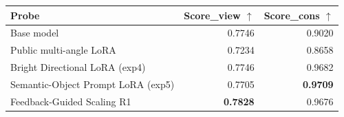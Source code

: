 \begin{tabular}{lrr}
\toprule
Probe & Score\_view $\uparrow$ & Score\_cons $\uparrow$ \\
\midrule
Base model & 0.7746 & 0.9020 \\
Public multi-angle LoRA & 0.7234 & 0.8658 \\
Bright Directional LoRA (exp4) & 0.7746 & 0.9682 \\
Semantic-Object Prompt LoRA (exp5) & 0.7705 & \textbf{0.9709} \\
Feedback-Guided Scaling R1 & \textbf{0.7828} & 0.9676 \\
\bottomrule
\end{tabular}

